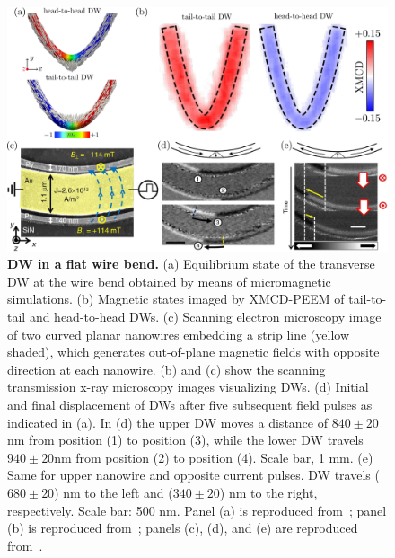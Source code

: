 \documentclass[runningheads]{llncs}
\begin{document}
\begin{figure}[t]
	\includegraphics[width=\textwidth]{fig_dw_curved_wire}
	\caption{\label{fig:dw_wire_1}%
		\textbf{DW in a flat wire bend.} (a) Equilibrium state of the transverse DW at the wire bend obtained by means of micromagnetic simulations. (b) Magnetic states imaged by XMCD-PEEM of tail-to-tail and head-to-head DWs. (c) Scanning electron microscopy image of two curved planar nanowires embedding a strip line (yellow shaded), which generates out-of-plane magnetic	fields with opposite direction at each nanowire. (b) and (c) show the scanning transmission x-ray microscopy images visualizing DWs. (d) Initial and final displacement of DWs after five subsequent field pulses as indicated in (a). In (d) the upper DW moves a distance of $840\pm20$nm from position (1) to position (3), while the lower DW travels $940\pm20$nm from position (2) to position (4). Scale bar, 1 mm. (e) Same for upper nanowire and opposite current pulses. DW travels ($680 \pm 20$) nm to the left and ($340\pm20$) nm to the right, respectively. Scale bar: 500 nm. Panel (a) is reproduced from~\cite{Yershov15b}; panel (b) is reproduced from~\cite{Volkov19c}; panels (c), (d), and (e) are reproduced from~\cite{Kim14}.}
\end{figure}
\end{document}
